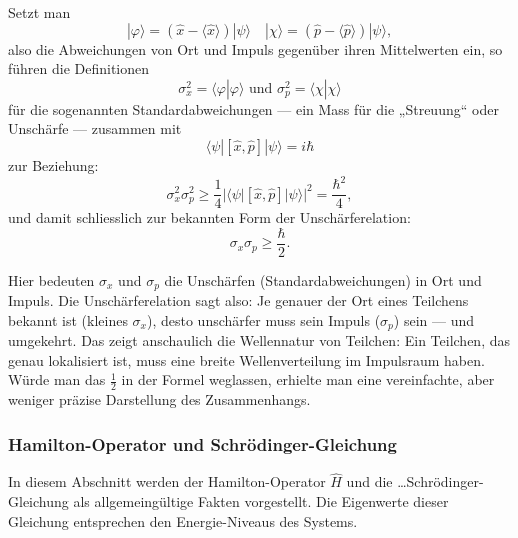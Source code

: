	Setzt man
	\begin{equation}
		|\varphi\rangle = (\hat{x} - \langle \hat{x} \rangle) |\psi\rangle \quad |\chi\rangle = (\hat{p} - \langle \hat{p} \rangle) | \psi\rangle,
	\end{equation}
	also die Abweichungen von Ort und Impuls gegenüber ihren Mittelwerten ein, so führen die Definitionen
	\begin{equation}
		\sigma_x^2 = \langle\varphi | \varphi\rangle \text{ und } \sigma_p^2 = \langle\chi | \chi\rangle
	\end{equation}
	für die sogenannten Standardabweichungen --- ein Mass für die „Streuung“ oder Unschärfe --- zusammen mit
	\begin{equation}
		\langle\psi | [\hat{x},\hat{p}] | \psi\rangle = i\hbar
	\end{equation}
	zur Beziehung:
	\begin{equation}
		\sigma_x^2 \sigma_p^2 \ge \frac{1}{4} |\langle\psi | [\hat{x},\hat{p}] | \psi\rangle|^2 = \frac{\hbar^2}{4},
	\end{equation}
	und damit schliesslich zur bekannten Form der Unschärferelation:
	\begin{equation}
		\sigma_x \sigma_p \ge \frac{\hbar}{2}.
	\end{equation}

	Hier bedeuten $\sigma_x$ und $\sigma_p$ die Unschärfen (Standardabweichungen) in Ort und Impuls.
	Die Unschärferelation sagt also:
	Je genauer der Ort eines Teilchens bekannt ist (kleines $\sigma_x$), desto unschärfer muss sein Impuls ($\sigma_p$) sein --- und umgekehrt.
	Das zeigt anschaulich die Wellennatur von Teilchen:
	Ein Teilchen, das genau lokalisiert ist, muss eine breite Wellenverteilung im Impulsraum haben.
	Würde man das $\tfrac{1}{2}$ in der Formel weglassen, erhielte man eine vereinfachte, aber weniger präzise Darstellung des Zusammenhangs.

\subsubsection{Hamilton-Operator und Schrödinger-Gleichung%
\label{fourier:subsubsection:hamiltonOperatorUndSchroedinger}} 
In diesem Abschnitt werden der Hamilton-Operator \( \hat{H} \) und die \dots Schrödinger-Gleichung als allgemeingültige Fakten vorgestellt.
Die Eigenwerte dieser Gleichung entsprechen den Energie-Niveaus des Systems. %

